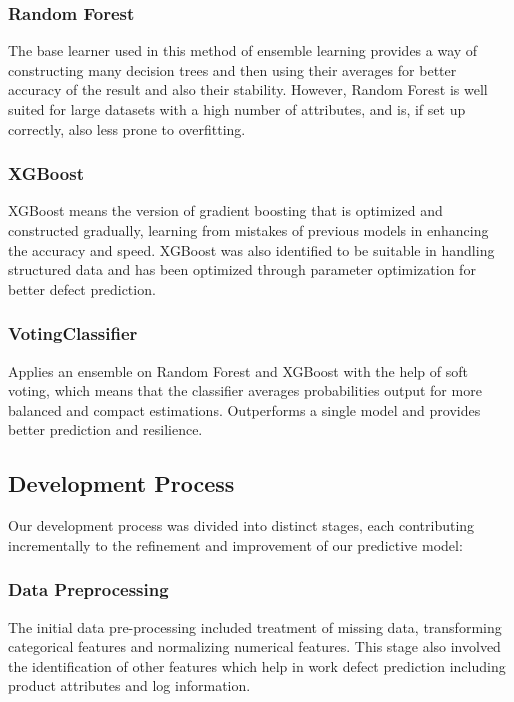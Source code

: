 \documentclass[conference]{IEEEtran}
\begin{document}
\subsubsection{Random Forest}
The base learner used in this method of ensemble learning provides a way of constructing many decision trees and then using their averages for better accuracy of the result and also their stability. However, Random Forest is well suited for large datasets with a high number of attributes, and is, if set up correctly, also less prone to overfitting.

\subsubsection{XGBoost}
XGBoost means the version of gradient boosting that is optimized and constructed gradually, learning from mistakes of previous models in enhancing the accuracy and speed. XGBoost was also identified to be suitable in handling structured data and has been optimized through parameter optimization for better defect prediction.
 
\subsubsection{VotingClassifier}
Applies an ensemble on Random Forest and XGBoost with the help of soft voting, which means that the classifier averages probabilities output for more balanced and compact estimations. Outperforms a single model and provides better prediction and resilience.



\subsection{Development Process}

Our development process was divided into distinct stages, each contributing incrementally to the refinement and improvement of our predictive model: 

\subsubsection{Data Preprocessing}
The initial data pre-processing included treatment of missing data, transforming categorical features and normalizing numerical features. This stage also involved the identification of other features which help in work defect prediction including product attributes and log information.
\end{document}
